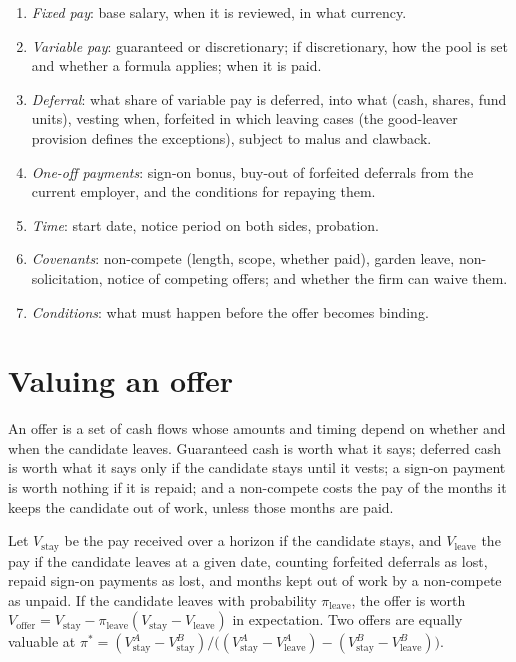 \begin{method}\label{met:iv:offers-compensation-and-non-competes:read}
\begin{enumerate}
\item \emph{Fixed pay}: base salary, when it is reviewed, in what currency.
\item \emph{Variable pay}: guaranteed or discretionary; if discretionary, how the pool is set and whether a
formula applies; when it is paid.
\item \emph{Deferral}: what share of variable pay is deferred, into what (cash, shares, fund units), vesting
when, forfeited in which leaving cases (the good-leaver provision defines the exceptions), subject to malus
and clawback.
\item \emph{One-off payments}: sign-on bonus, buy-out of forfeited deferrals from the current employer, and
the conditions for repaying them.
\item \emph{Time}: start date, notice period on both sides, probation.
\item \emph{Covenants}: non-compete (length, scope, whether paid), garden leave, non-solicitation, notice of
competing offers; and whether the firm can waive them.
\item \emph{Conditions}: what must happen before the offer becomes binding.
\end{enumerate}
\end{method}

\section{Valuing an offer}

An offer is a set of cash flows whose amounts and timing depend on whether and when the candidate leaves.
Guaranteed cash is worth what it says; deferred cash is worth what it says only if the candidate stays until it
vests; a sign-on payment is worth nothing if it is repaid; and a non-compete costs the pay of the months it
keeps the candidate out of work, unless those months are paid.

\begin{proposition}\label{prop:iv:offers-compensation-and-non-competes:value}
Let $V_{\mathrm{stay}}$ be the pay received over a horizon if the candidate stays, and $V_{\mathrm{leave}}$ the
pay if the candidate leaves at a given date, counting forfeited deferrals as lost, repaid sign-on payments as
lost, and months kept out of work by a non-compete as unpaid. If the candidate leaves with probability
$\pi_{\mathrm{leave}}$, the offer is worth $V_{\mathrm{offer}} = V_{\mathrm{stay}} - \pi_{\mathrm{leave}}(V_{\mathrm{stay}}
- V_{\mathrm{leave}})$ in expectation. Two offers are equally valuable at
$\pi^\ast = (V^A_{\mathrm{stay}} - V^B_{\mathrm{stay}})/\big((V^A_{\mathrm{stay}} - V^A_{\mathrm{leave}}) -
(V^B_{\mathrm{stay}} - V^B_{\mathrm{leave}})\big)$.
\end{proposition}

